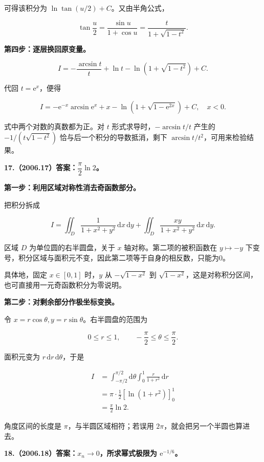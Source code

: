 \documentclass[UTF8,11pt,fontset=windows]{ctexart}
\begin{document}
可得该积分为 $\ln\tan(u/2)+C$。又由半角公式，

$$
\tan\frac u2=\frac{\sin u}{1+\cos u}
=\frac{t}{1+\sqrt{1-t^2}}.
$$

\textbf{第四步：逐层换回原变量。}

$$
I=-\frac{\arcsin t}{t}
 +\ln t-\ln(1+\sqrt{1-t^2})+C.
$$

代回 $t=\mathrm e^x$，便得

$$
\boxed{I=-\mathrm e^{-x}\arcsin\mathrm e^x
+x-\ln(1+\sqrt{1-\mathrm e^{2x}})+C,\quad x<0.}
$$

式中两个对数的真数都为正。对 $t$ 形式求导时，$-\arcsin t/t$ 产生的 $-1/(t\sqrt{1-t^2})$ 恰与后一个积分的导数抵消，剩下 $\arcsin t/t^2$，可用来检验结果。

\clearpage

\textbf{17.（2006.17）答案：$\dfrac\pi2\ln2$。}

\textbf{第一步：利用区域对称性消去奇函数部分。}

把积分拆成

$$
I=\iint_D\frac1{1+x^2+y^2}\,\mathrm dx\,\mathrm dy
 +\iint_D\frac{xy}{1+x^2+y^2}\,\mathrm dx\,\mathrm dy.
$$

区域 $D$ 为单位圆的右半圆盘，关于 $x$ 轴对称。第二项的被积函数在 $y\mapsto-y$ 下变号，积分区域与面积元不变，因此第二项等于自身的相反数，只能为0。

具体地，固定 $x\in[0,1]$ 时，$y$ 从 $-\sqrt{1-x^2}$ 到 $\sqrt{1-x^2}$，这是对称积分区间，也可直接用一元奇函数积分为零说明。

\textbf{第二步：对剩余部分作极坐标变换。}

令 $x=r\cos\theta,y=r\sin\theta$。右半圆盘的范围为

$$
0\le r\le1,\qquad-\frac\pi2\le\theta\le\frac\pi2.
$$

面积元变为 $r\,\mathrm dr\,\mathrm d\theta$，于是

$$
\begin{aligned}
I&=\int_{-\pi/2}^{\pi/2}\mathrm d\theta
\int_0^1\frac r{1+r^2}\,\mathrm dr\\
&=\pi\cdot\frac12\left[\ln(1+r^2)\right]_0^1\\
&=\boxed{\frac\pi2\ln2}.
\end{aligned}
$$

角度区间的长度是 $\pi$，与半圆区域相符；若误用 $2\pi$，就会把另一个半圆也算进去。

\clearpage

\textbf{18.（2006.18）答案：$x_n\to0$，所求幂式极限为 $\mathrm e^{-1/6}$。}
\end{document}
